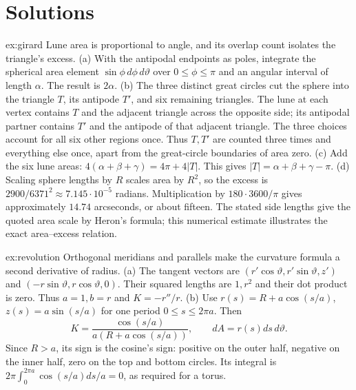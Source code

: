 \section{Solutions}

\begin{solution}{ex:girard}
\idea Lune area is proportional to angle, and its overlap count isolates the triangle's excess.
\writeup (a) With the antipodal endpoints as poles, integrate the spherical area element $\sin\phi\,d\phi\,d\vartheta$ over $0\le\phi\le\pi$ and an angular interval of length $\alpha$. The result is $2\alpha$.
(b) The three distinct great circles cut the sphere into the triangle $T$, its antipode $T'$, and six remaining triangles. The lune at each vertex contains $T$ and the adjacent triangle across the opposite side; its antipodal partner contains $T'$ and the antipode of that adjacent triangle. The three choices account for all six other regions once. Thus $T,T'$ are counted three times and everything else once, apart from the great-circle boundaries of area zero.
(c) Add the six lune areas:
$4(\alpha+\beta+\gamma)=4\pi+4|T|$. This gives $|T|=\alpha+\beta+\gamma-\pi$.
(d) Scaling sphere lengths by $R$ scales area by $R^2$, so the excess is $2900/6371^2\approx7.145\cdot10^{-5}$ radians. Multiplication by $180\cdot3600/\pi$ gives approximately $14.74$ arcseconds, or about fifteen. The stated side lengths give the quoted area scale by Heron's formula; this numerical estimate illustrates the exact area--excess relation.
\end{solution}

\begin{solution}{ex:revolution}
\idea Orthogonal meridians and parallels make the curvature formula a second derivative of radius.
\writeup (a) The tangent vectors are $(r'\cos\vartheta,r'\sin\vartheta,z')$ and $(-r\sin\vartheta,r\cos\vartheta,0)$. Their squared lengths are $1,r^2$ and their dot product is zero. Thus $a=1,b=r$ and $K=-r''/r$.
(b) Use $r(s)=R+a\cos(s/a)$, $z(s)=a\sin(s/a)$ for one period $0\le s\le2\pi a$. Then
\[
K=\frac{\cos(s/a)}{a(R+a\cos(s/a))},\qquad dA=r(s)ds\,d\vartheta.
\]
Since $R>a$, its sign is the cosine's sign: positive on the outer half, negative on the inner half, zero on the top and bottom circles. Its integral is $2\pi\int_0^{2\pi a}\cos(s/a)ds/a=0$, as required for a torus.
\end{solution}

